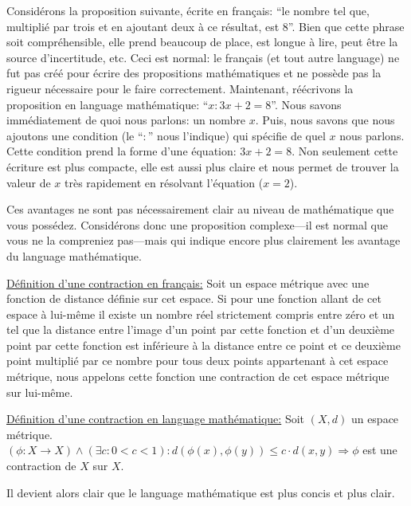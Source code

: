 Considérons la proposition suivante, écrite en français: ``le nombre tel que, multiplié par trois et en ajoutant deux à ce résultat, est 8''. Bien que cette phrase soit compréhensible, elle prend beaucoup de place, est longue à lire, peut être la source d'incertitude, etc. Ceci est normal: le français (et tout autre language) ne fut pas créé pour écrire des propositions mathématiques et ne possède pas la rigueur nécessaire pour le faire correctement. Maintenant, réécrivons la proposition en language mathématique: ``$x : 3x+2 = 8$''. Nous savons immédiatement de quoi nous parlons: un nombre $x$. Puis, nous savons que nous ajoutons une condition (le ``$:$'' nous l'indique) qui spécifie de quel $x$ nous parlons. Cette condition prend la forme d'une équation: $3x+2 = 8$. Non seulement cette écriture est plus compacte, elle est aussi plus claire et nous permet de trouver la valeur de $x$ très rapidement en résolvant l'équation ($x = 2$).

\begin{exemple}
    Ces avantages ne sont pas nécessairement clair au niveau de mathématique que vous possédez. Considérons donc une proposition complexe---il est normal que vous ne la compreniez pas---mais qui indique encore plus clairement les avantage du language mathématique.

    \underline{Définition d'une contraction en français:} Soit un espace métrique avec une fonction de distance définie sur cet espace. Si pour une fonction allant de cet espace à lui-même il existe un nombre réel strictement compris entre zéro et un tel que la distance entre l'image d'un point par cette fonction et d'un deuxième point par cette fonction est inférieure à la distance entre ce point et ce deuxième point multiplié par ce nombre pour tous deux points appartenant à cet espace métrique, nous appelons cette fonction une contraction de cet espace métrique sur lui-même.

    \underline{Définition d'une contraction en language mathématique:} Soit $(X,d)$ un espace métrique. $(\phi \colon X \to X) \wedge (\exists c : 0<c<1) : d(\phi(x), \phi(y)) \leq c\cdot d(x,y) \Rightarrow \phi$ est une contraction de $X$ sur $X$.

    Il devient alors clair que le language mathématique est plus concis et plus clair.
\end{exemple}

